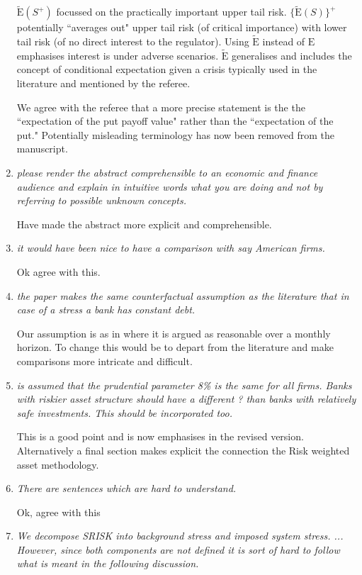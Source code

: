 \documentclass[11pt]{amsart}
\newcommand{\E}{{\mathrm E}}
\newcommand{\Es}{\widetilde\E}
\begin{document}
\begin{enumerate}
 $\Es(S^+)$ focussed on the practically important  upper tail risk.   $\{\Es(S)\}^+$ potentially ``averages out" upper tail risk (of critical importance) with lower tail risk (of no direct interest to the regulator).  Using $\Es$ instead of $\E$ emphasises interest is under adverse scenarios.   $\Es$ generalises and includes the concept of conditional expectation given a crisis typically used  in the literature and mentioned by the referee.

We agree with the referee that a more precise statement is the  
the ``expectation of the put payoff value" rather than the ``expectation of the put."   Potentially misleading terminology has now been removed from the manuscript.

\item {\it please render the abstract comprehensible to an economic and finance audience and explain in intuitive words what you are doing and not by referring to possible unknown concepts.}

Have made the abstract more explicit and comprehensible.

\item {\it it would have been nice to have a comparison with say American firms.}

Ok agree with this.

\item {\it the paper makes the same counterfactual assumption as the literature that in case of a stress a bank has constant debt.}

Our assumption is as in \cite{brownlees2015} where it is argued as reasonable over a monthly horizon.   To change this would be to depart from the literature and make comparisons more intricate and difficult.  

\item {\it is assumed that the prudential parameter 8\% is the same for all firms. Banks with riskier asset structure should have a different ? than banks with relatively safe investments. This should be incorporated too.}

This is a good point and is now emphasises  in the revised version.   Alternatively a final section makes explicit the connection the  Risk weighted asset  methodology.

\item {\it There are sentences which are hard to understand.}

Ok, agree with this

\item {\it We decompose SRISK into background stress and imposed system stress. ... However, since both components are not defined it is sort of hard to follow what is meant in the following discussion.}


\end{enumerate}
\end{document}
